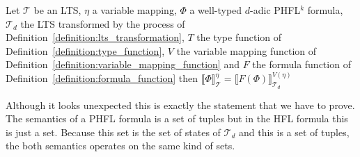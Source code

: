 \begin{lemma}
    \label{lemma:model_check_phfl_k}
    Let $\mathcal{T}$ be an LTS, $\eta$ a variable mapping, $\Phi$ a well-typed $d$-adic
    PHFL$^k$ formula, $\mathcal{T}_d$ the LTS transformed by the process of
    Definition~\ref{definition:lts_transformation}, $T$ the type function of Definition~\ref{definition:type_function},
    $V$ the variable mapping function of Definition~\ref{definition:variable_mapping_function}
    and $F$ the formula function of Definition~\ref{definition:formula_function} then $\llbracket \Phi \rrbracket^\eta_\mathcal{T} = \llbracket F(\Phi)
    \rrbracket^{V(\eta)}_{\mathcal{T}_d}$
\end{lemma}
Although it looks unexpected this is exactly the statement that we have to prove. The semantics of a PHFL formula is a set of tuples but in the HFL formula this is just a set. Because this set is the set of states of $\mathcal{T}_d$ and this is a set of tuples, the both semantics operates on the same kind of sets.
